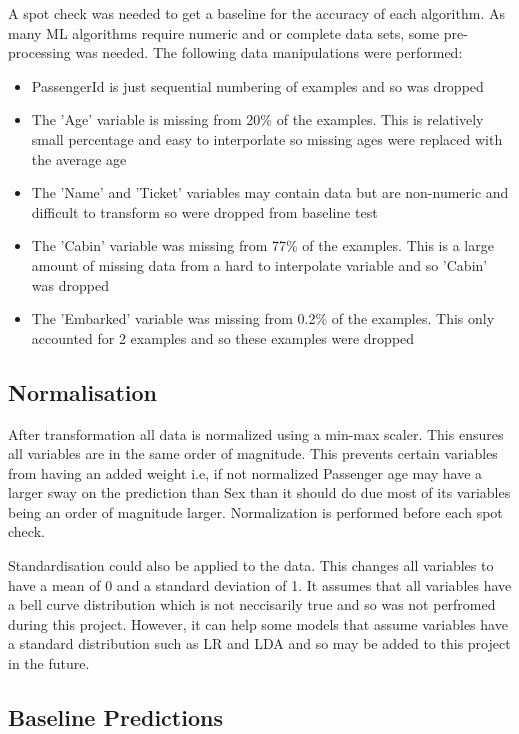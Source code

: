 \documentclass{article}
\begin{document}
A spot check was needed to get a baseline for the accuracy of each algorithm. As many ML algorithms require numeric and or complete data sets, some pre-processing was needed.
\linebreak
The following data manipulations were performed:
\begin{itemize}
\item PassengerId is just sequential numbering of examples and so was dropped
\item The 'Age' variable is missing from 20\% of the examples. This is relatively small percentage and easy to interporlate so missing ages were replaced with the average age
\item The 'Name' and 'Ticket' variables may contain data but are non-numeric and difficult to transform so were dropped from baseline test
\item The 'Cabin' variable was missing from 77\% of the examples. This is a large amount of missing data from a hard to interpolate variable and so 'Cabin' was dropped
\item The 'Embarked' variable was missing from 0.2\% of the examples. This only accounted for 2 examples and so these examples were dropped
\end{itemize}


\subsection{Normalisation}
After transformation all data is normalized using a min-max scaler. This ensures all variables are in the same order of magnitude. This prevents certain variables from having an added weight i.e, if not normalized Passenger age may have a larger sway on the prediction than Sex than it should do due most of its variables being an order of magnitude larger. Normalization is performed before each spot check.
\par
Standardisation could also be applied to the data. This changes all variables to have a mean of 0 and a standard deviation of 1. It assumes that all variables have a bell curve distribution which is not neccisarily true and so was not perfromed during this project. However, it can help some models that assume variables have a standard distribution such as LR and LDA and so may be added to this project in the future.

\newpage
\subsection{Baseline Predictions}
\end{document}
